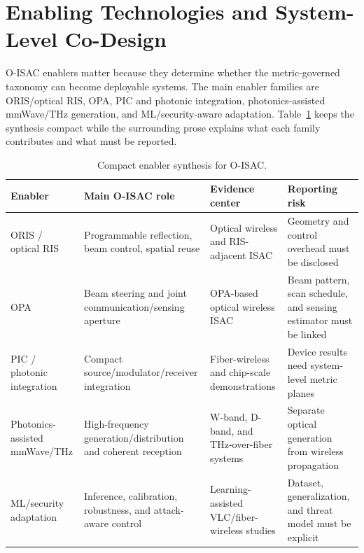 \documentclass[letterpaper,journal]{IEEEtran}
\begin{document}
\section{Enabling Technologies and System-Level Co-Design}
\label{sec:enablers}

O-ISAC enablers matter because they determine whether the metric-governed taxonomy can become deployable systems. The main enabler families are ORIS/optical RIS, OPA, PIC and photonic integration, photonics-assisted mmWave/THz generation, and ML/security-aware adaptation. Table~\ref{tab:vi_a_enablers} keeps the synthesis compact while the surrounding prose explains what each family contributes and what must be reported.

\begin{table}[!t]
    \caption{Compact enabler synthesis for O-ISAC.}
    \label{tab:vi_a_enablers}
    \centering
    \scriptsize
    \setlength{\tabcolsep}{2.8pt}
    \renewcommand{\arraystretch}{1.08}
    \begin{tabularx}{\textwidth}{@{}p{2.15cm}p{2.65cm}p{2.3cm}X@{}}
        \toprule
        Enabler & Main O-ISAC role & Evidence center & Reporting risk \\
        \midrule
        ORIS / optical RIS & Programmable reflection, beam control, spatial reuse & Optical wireless and RIS-adjacent ISAC \cite{O_ISAC_163} & Geometry and control overhead must be disclosed \\
        OPA & Beam steering and joint communication/sensing aperture & OPA-based optical wireless ISAC \cite{O_ISAC_061,O_ISAC_091} & Beam pattern, scan schedule, and sensing estimator must be linked \\
        PIC / photonic integration & Compact source/modulator/receiver integration & Fiber-wireless and chip-scale demonstrations \cite{O_ISAC_036,O_ISAC_045} & Device results need system-level metric planes \\
        Photonics-assisted mmWave/THz & High-frequency generation/distribution and coherent reception & W-band, D-band, and THz-over-fiber systems \cite{O_ISAC_029,O_ISAC_070} & Separate optical generation from wireless propagation \\
        ML/security adaptation & Inference, calibration, robustness, and attack-aware control & Learning-assisted VLC/fiber-wireless studies \cite{O_ISAC_039,O_ISAC_242} & Dataset, generalization, and threat model must be explicit \\
        \bottomrule
    \end{tabularx}
\end{table}
\end{document}
